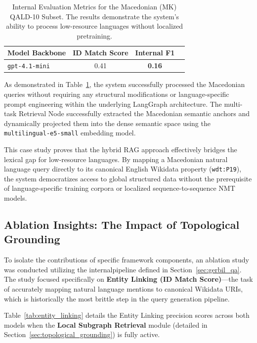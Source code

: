 \begin{table}[htbp]
\centering
\caption{Internal Evaluation Metrics for the Macedonian (MK) QALD-10 Subset. The results demonstrate the system's ability to process low-resource languages without localized pretraining.}
\label{tab:macedonian_results}
\begin{tabular}{lccc}
\hline
\textbf{Model Backbone} & \textbf{ID Match Score} & \textbf{Internal F1} \\
\hline
\texttt{gpt-4.1-mini} & 0.41 & \textbf{0.16} \\
\hline
\end{tabular}
\end{table}

As demonstrated in Table~\ref{tab:macedonian_results}, the system successfully processed the Macedonian queries without requiring any structural modifications or language-specific prompt engineering within the underlying LangGraph architecture. The multi-task Retrieval Node successfully extracted the Macedonian semantic anchors and dynamically projected them into the dense semantic space using the \texttt{multilingual-e5-small} embedding model. 

This case study proves that the hybrid RAG approach effectively bridges the lexical gap for low-resource languages. By mapping a Macedonian natural language query directly to its canonical English Wikidata property (\texttt{wdt:P19}), the system democratizes access to global structured data without the prerequisite of language-specific training corpora or localized sequence-to-sequence NMT models.

\subsection{Ablation Insights: The Impact of Topological Grounding}
\label{sec:ablation}

To isolate the contributions of specific framework components, an ablation study was conducted utilizing the internalpipeline defined in Section~\ref{sec:gerbil_qa}. The study focused specifically on \textbf{Entity Linking (ID Match Score)}—the task of accurately mapping natural language mentions to canonical Wikidata URIs, which is historically the most brittle step in the query generation pipeline.

Table~\ref{tab:entity_linking} details the Entity Linking precision scores across both models when the \textbf{Local Subgraph Retrieval} module (detailed in Section~\ref{sec:topological_grounding}) is fully active.

